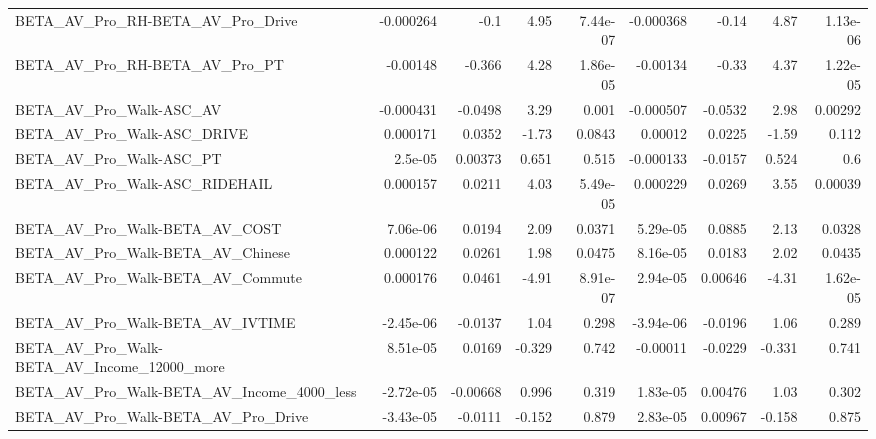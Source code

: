 \begin{tabular}{lrrrrrrrr}
BETA\_AV\_Pro\_RH-BETA\_AV\_Pro\_Drive                   &   -0.000264 &         -0.1 &      4.95 & 7.44e-07 &  -0.000368 &       -0.14 &         4.87 &      1.13e-06 \\
BETA\_AV\_Pro\_RH-BETA\_AV\_Pro\_PT                      &    -0.00148 &       -0.366 &      4.28 & 1.86e-05 &   -0.00134 &       -0.33 &         4.37 &      1.22e-05 \\
BETA\_AV\_Pro\_Walk-ASC\_AV                            &   -0.000431 &      -0.0498 &      3.29 &    0.001 &  -0.000507 &     -0.0532 &         2.98 &       0.00292 \\
BETA\_AV\_Pro\_Walk-ASC\_DRIVE                         &    0.000171 &       0.0352 &     -1.73 &   0.0843 &    0.00012 &      0.0225 &        -1.59 &         0.112 \\
BETA\_AV\_Pro\_Walk-ASC\_PT                            &     2.5e-05 &      0.00373 &     0.651 &    0.515 &  -0.000133 &     -0.0157 &        0.524 &           0.6 \\
BETA\_AV\_Pro\_Walk-ASC\_RIDEHAIL                      &    0.000157 &       0.0211 &      4.03 & 5.49e-05 &   0.000229 &      0.0269 &         3.55 &       0.00039 \\
BETA\_AV\_Pro\_Walk-BETA\_AV\_COST                      &    7.06e-06 &       0.0194 &      2.09 &   0.0371 &   5.29e-05 &      0.0885 &         2.13 &        0.0328 \\
BETA\_AV\_Pro\_Walk-BETA\_AV\_Chinese                   &    0.000122 &       0.0261 &      1.98 &   0.0475 &   8.16e-05 &      0.0183 &         2.02 &        0.0435 \\
BETA\_AV\_Pro\_Walk-BETA\_AV\_Commute                   &    0.000176 &       0.0461 &     -4.91 & 8.91e-07 &   2.94e-05 &     0.00646 &        -4.31 &      1.62e-05 \\
BETA\_AV\_Pro\_Walk-BETA\_AV\_IVTIME                    &   -2.45e-06 &      -0.0137 &      1.04 &    0.298 &  -3.94e-06 &     -0.0196 &         1.06 &         0.289 \\
BETA\_AV\_Pro\_Walk-BETA\_AV\_Income\_12000\_more         &    8.51e-05 &       0.0169 &    -0.329 &    0.742 &   -0.00011 &     -0.0229 &       -0.331 &         0.741 \\
BETA\_AV\_Pro\_Walk-BETA\_AV\_Income\_4000\_less          &   -2.72e-05 &     -0.00668 &     0.996 &    0.319 &   1.83e-05 &     0.00476 &         1.03 &         0.302 \\
BETA\_AV\_Pro\_Walk-BETA\_AV\_Pro\_Drive                 &   -3.43e-05 &      -0.0111 &    -0.152 &    0.879 &   2.83e-05 &     0.00967 &       -0.158 &         0.875 \\

\end{tabular}
